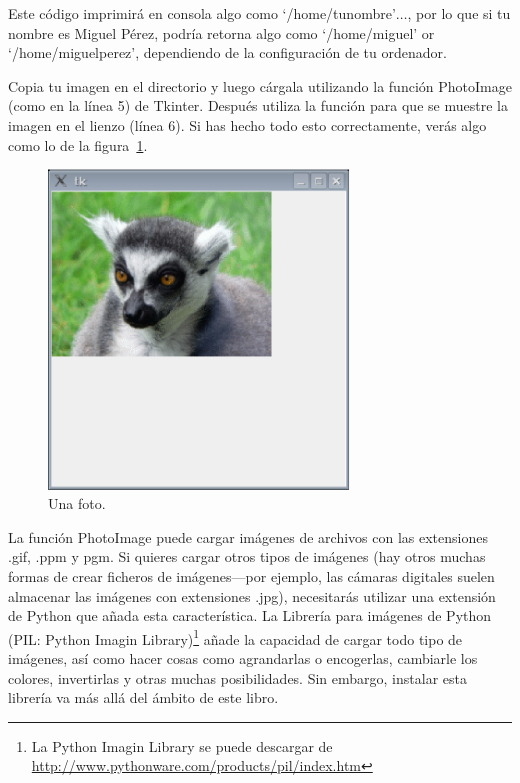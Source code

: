 \begin{LINUX}
Este código imprimirá en consola algo como `/home/tunombre'$\ldots$, por lo que si tu nombre es Miguel Pérez,  podría retorna algo como `/home/miguel' or `/home/miguelperez', dependiendo de la configuración de tu ordenador.
\end{LINUX}

Copia tu imagen en el directorio y luego cárgala utilizando la función PhotoImage (como en la línea 5) de Tkinter. Después utiliza la función  para que se muestre la imagen en el lienzo (línea 6). Si has hecho todo esto correctamente, verás algo como lo de la figura~\ref{fig43}.

\begin{figure}
\begin{center}
\includegraphics[width=80mm]{figure43.eps}
\end{center}
\caption{Una foto.}\label{fig43}
\end{figure}

La función PhotoImage puede cargar imágenes de archivos con las extensiones .gif, .ppm y pgm. Si quieres cargar otros tipos de imágenes (hay otros muchas formas de crear ficheros de imágenes---por ejemplo, las cámaras digitales suelen almacenar las imágenes con extensiones .jpg), necesitarás utilizar una extensión de Python que añada esta característica.  La Librería para imágenes de Python (PIL: Python Imagin Library)\footnote{La Python Imagin Library se puede descargar de \href{http://www.pythonware.com/products/pil/index.htm}{http://www.pythonware.com/products/pil/index.htm}} añade la capacidad de cargar todo tipo de imágenes, así como hacer cosas como agrandarlas o encogerlas, cambiarle los colores, invertirlas y otras muchas posibilidades. Sin embargo, instalar esta librería va más allá del ámbito de este libro.

